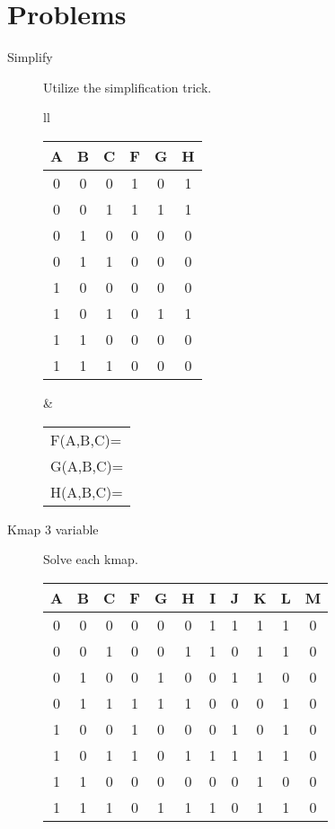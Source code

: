 \section{Problems}
\begin{description}

\item[Simplify] Utilize the simplification trick.

\begin{tabular}{ll}
\begin{tabular}{c|c|c||c|c|c}
A & B & C & F & G & H  \\ \hline
0 & 0 & 0 & 1 & 0 & 1  \\ \hline
0 & 0 & 1 & 1 & 1 & 1  \\ \hline
0 & 1 & 0 & 0 & 0 & 0  \\ \hline
0 & 1 & 1 & 0 & 0 & 0  \\ \hline
1 & 0 & 0 & 0 & 0 & 0  \\ \hline
1 & 0 & 1 & 0 & 1 & 1  \\ \hline
1 & 1 & 0 & 0 & 0 & 0  \\ \hline
1 & 1 & 1 & 0 & 0 & 0  \\
\end{tabular}
&
\begin{tabular}{l}
F(A,B,C)= \\
G(A,B,C)= \\
H(A,B,C)= \\
\end{tabular} 
\end{tabular}

\pagebreak

\item[Kmap 3 variable] Solve each kmap.

\begin{tabular}{c|c|c||c|c|c|c|c|c|c|c}
A & B & C & F & G & H & I & J & K & L & M  \\ \hline
0 & 0 & 0 & 0 & 0 & 0 & 1 & 1 & 1 & 1 & 0  \\ \hline
0 & 0 & 1 & 0 & 0 & 1 & 1 & 0 & 1 & 1 & 0  \\ \hline
0 & 1 & 0 & 0 & 1 & 0 & 0 & 1 & 1 & 0 & 0  \\ \hline
0 & 1 & 1 & 1 & 1 & 1 & 0 & 0 & 0 & 1 & 0  \\ \hline
1 & 0 & 0 & 1 & 0 & 0 & 0 & 1 & 0 & 1 & 0  \\ \hline
1 & 0 & 1 & 1 & 0 & 1 & 1 & 1 & 1 & 1 & 0  \\ \hline
1 & 1 & 0 & 0 & 0 & 0 & 0 & 0 & 1 & 0 & 0  \\ \hline
1 & 1 & 1 & 0 & 1 & 1 & 1 & 0 & 1 & 1 & 0  
\end{tabular}


\end{description}
